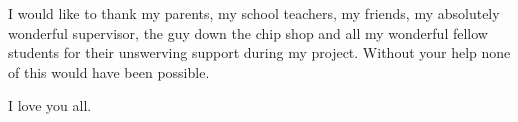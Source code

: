 I would like to thank my parents, my school teachers, my friends, my
absolutely wonderful supervisor, the guy down the chip shop and all
my wonderful fellow students for their unswerving support during my
project. Without your help none of this would have been possible.

I love you all.
